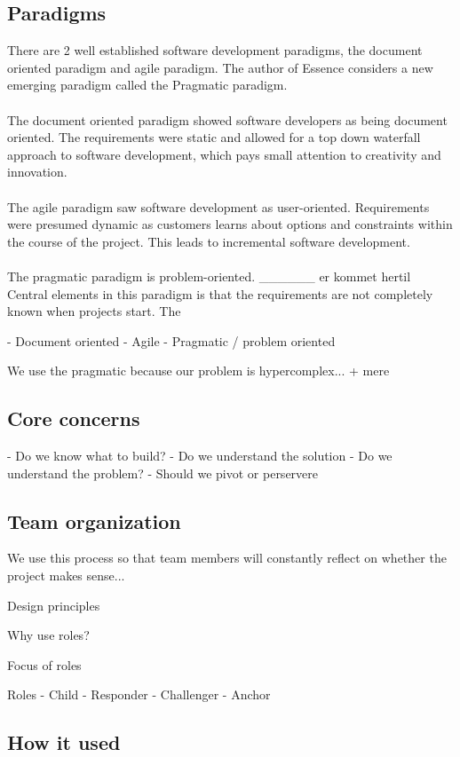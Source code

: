 \subsection{Paradigms}
There are 2 well established software development paradigms, the document oriented paradigm and agile paradigm.
The author of Essence considers a new emerging paradigm called the Pragmatic paradigm.
\\\\
The document oriented paradigm showed software developers as being document oriented. 
The requirements were static and allowed for a top down waterfall approach to software development, which pays small attention to creativity and innovation.
\\\\
The agile paradigm saw software development as user-oriented.
Requirements were presumed dynamic as customers learns about options and constraints within the course of the project.
This leads to incremental software development.
\\\\
The pragmatic paradigm is problem-oriented. 
______ er kommet hertil
Central elements in this paradigm is that the requirements are not completely known when projects start. 
The 


- Document oriented
- Agile 
- Pragmatic / problem oriented

We use the pragmatic because our problem is hypercomplex... + mere

\subsection{Core concerns}

- Do we know what to build?
- Do we understand the solution
- Do we understand the problem?
- Should we pivot or perservere

\subsection{Team organization}
We use this process so that team members will constantly reflect on whether the project makes sense...

Design principles

Why use roles?

Focus of roles

Roles
- Child
- Responder
- Challenger
- Anchor

\subsection{How it used}
